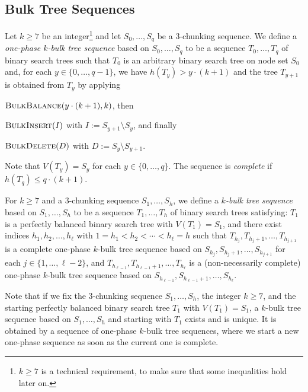 \documentclass[10pt, conference, compsocconf]{IEEEtran}
\let\ge\geqslant
\let\leq\leqslant
\let\geq\geqslant
\begin{document}
\subsection{Bulk Tree Sequences}



Let $k\ge 7$ be an integer\footnote{$k \geq 7$ is a technical requirement, to make sure that some inequalities hold later on.} and let $S_0,\dots,S_q$ be a $3$-chunking sequence.
We define a \emph{one-phase $k$-bulk tree sequence} based on $S_0,\dots,S_q$ to be a sequence $T_0, \dots, T_{q}$ of binary search trees such that $T_0$ is an arbitrary binary search tree on node set $S_0$ and,  for each $y\in \{0, \dots, q-1\}$, we have $h(T_y)>y\cdot(k+1)$ and
the tree $T_{y+1}$ is obtained from $T_y$ by applying
\begin{compactenum}[(i)]
    \item $\textsc{BulkBalance}(y\cdot(k+1),k)$, then
    \item $\textsc{BulkInsert}(I)$ with $I:=S_{y+1} \setminus S_{y}$, and finally
    \item $\textsc{BulkDelete}(D)$ with $D:=S_{y} \setminus S_{y+1}$.
\end{compactenum}
Note that $V(T_y)=S_y$ for each $y \in \{0, \dots, q\}$.
The sequence is \emph{complete} if $h(T_q)\leq q\cdot(k+1)$.

For $k\geq 7$ and a $3$-chunking sequence $S_1,\dots,S_h$, we define
a \emph{$k$-bulk tree sequence} based on $S_1,\dots,S_h$ to be a sequence $T_1, \dots, T_h$ of binary search trees satisfying:
$T_1$ is a perfectly balanced binary search tree with $V(T_1)=S_1$, and
there exist indices $h_1,h_2,\dots,h_{\ell}$ with $1=h_1 < h_2 < \cdots <h_{\ell} = h$  such that $T_{h_j}, T_{h_j+1},\dots,T_{h_{j+1}}$ is a complete one-phase $k$-bulk tree sequence based on $S_{h_j}, S_{h_j+1},\dots,S_{h_{j+1}}$
for each $j\in\{1,\dots,\ell-2\}$, and $T_{h_{\ell-1}}, T_{h_{\ell-1}+1},\dots,T_{h_{\ell}}$ is a (non-necessarily complete) one-phase $k$-bulk tree sequence based on $S_{h_{\ell-1}},S_{h_{\ell-1}+1},\dots,S_{h_{\ell}}$.

Note that if we fix the $3$-chunking sequence $S_1,\dots,S_h$, the integer $k\ge 7$, and the starting perfectly balanced binary search tree $T_1$ with $V(T_1)=S_1$, a $k$-bulk tree sequence based on $S_1,\dots,S_h$ and starting with $T_1$ exists and is unique. It is obtained by a sequence of one-phase $k$-bulk tree sequences, where we start a new one-phase sequence as soon as the current one is complete.
\end{document}
